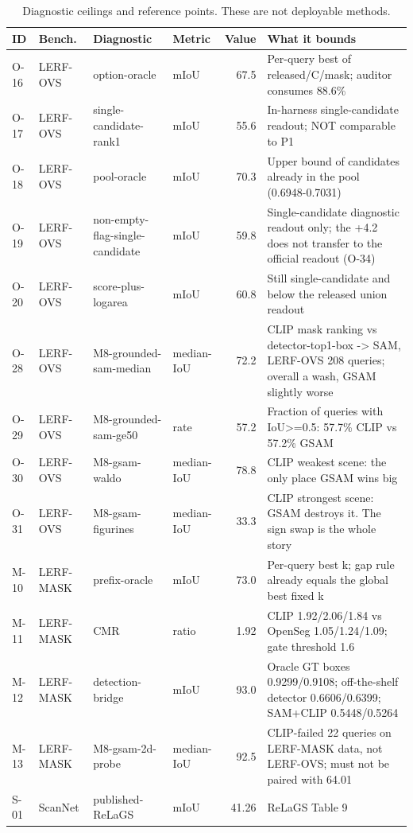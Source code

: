 \begin{table}[t]
\centering
\small
\caption{Diagnostic ceilings and reference points. These are not deployable methods.}
\label{tab:ceil}
\begin{tabular}{llllrp{5.6cm}}
\toprule
ID & Bench. & Diagnostic & Metric & Value & What it bounds \\
\midrule
O-16 & LERF-OVS & option-oracle & mIoU & 67.5 & Per-query best of released/C/mask; auditor consumes 88.6\% \\
O-17 & LERF-OVS & single-candidate-rank1 & mIoU & 55.6 & In-harness single-candidate readout; NOT comparable to P1 \\
O-18 & LERF-OVS & pool-oracle & mIoU & 70.3 & Upper bound of candidates already in the pool (0.6948-0.7031) \\
O-19 & LERF-OVS & non-empty-flag-single-candidate & mIoU & 59.8 & Single-candidate diagnostic readout only; the +4.2 does not transfer to the official readout (O-34) \\
O-20 & LERF-OVS & score-plus-logarea & mIoU & 60.8 & Still single-candidate and below the released union readout \\
O-28 & LERF-OVS & M8-grounded-sam-median & median-IoU & 72.2 & CLIP mask ranking vs detector-top1-box -> SAM, LERF-OVS 208 queries; overall a wash, GSAM slightly worse \\
O-29 & LERF-OVS & M8-grounded-sam-ge50 & rate & 57.2 & Fraction of queries with IoU>=0.5: 57.7\% CLIP vs 57.2\% GSAM \\
O-30 & LERF-OVS & M8-gsam-waldo & median-IoU & 78.8 & CLIP weakest scene: the only place GSAM wins big \\
O-31 & LERF-OVS & M8-gsam-figurines & median-IoU & 33.3 & CLIP strongest scene: GSAM destroys it. The sign swap is the whole story \\
M-10 & LERF-MASK & prefix-oracle & mIoU & 73.0 & Per-query best k; gap rule already equals the global best fixed k \\
M-11 & LERF-MASK & CMR & ratio & 1.92 & CLIP 1.92/2.06/1.84 vs OpenSeg 1.05/1.24/1.09; gate threshold 1.6 \\
M-12 & LERF-MASK & detection-bridge & mIoU & 93.0 & Oracle GT boxes 0.9299/0.9108; off-the-shelf detector 0.6606/0.6399; SAM+CLIP 0.5448/0.5264 \\
M-13 & LERF-MASK & M8-gsam-2d-probe & median-IoU & 92.5 & CLIP-failed 22 queries on LERF-MASK data, not LERF-OVS; must not be paired with 64.01 \\
S-01 & ScanNet & published-ReLaGS & mIoU & 41.26 & ReLaGS Table 9 \\

\end{tabular}
\end{table}

